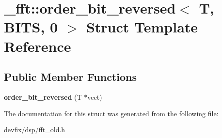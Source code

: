 \hypertarget{struct__fft_1_1order__bit__reversed_3_01T_00_01BITS_00_010_01_4}{}\section{\+\_\+fft\+:\+:order\+\_\+bit\+\_\+reversed$<$ T, B\+I\+TS, 0 $>$ Struct Template Reference}
\label{struct__fft_1_1order__bit__reversed_3_01T_00_01BITS_00_010_01_4}
\subsection*{Public Member Functions}
\begin{DoxyCompactItemize}
\item 
\mbox{\label{struct__fft_1_1order__bit__reversed_3_01T_00_01BITS_00_010_01_4_ab0f5b7ab6b450f7b5125bab7aa18d7a3}} 
{\bfseries order\+\_\+bit\+\_\+reversed} (T $\ast$vect)
\end{DoxyCompactItemize}


The documentation for this struct was generated from the following file\+:\begin{DoxyCompactItemize}
\item 
devfix/dsp/fft\+\_\+old.\+h\end{DoxyCompactItemize}
